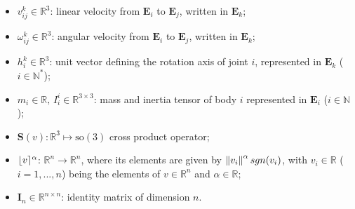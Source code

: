 \begin{itemize}
%
\item $v^{k}_{ij} \in \mathbb{R}^{3}$: linear velocity from $\mathbf{E}_i$ to  $\mathbf{E}_{j}$, written in $\mathbf{E}_k$;
%
\item $\omega^{k}_{ij} \in \mathbb{R}^{3}$: angular velocity from $\mathbf{E}_i$ to $\mathbf{E}_{j}$, written in $\mathbf{E}_k$;
%
%
%
\item $h^{k}_{i} \in \mathbb{R}^{3}$: unit vector defining the rotation axis of joint $i$, represented in $\mathbf{E}_k$ ($i \in \mathbb{N}^*$);
%

\item $m_i \in \mathbb{R} ,\, I^{i}_{i} \in \mathbb{R}^{3 \times 3}$: mass and inertia tensor of body $i$ represented in $\mathbf{E}_{i}$ ($i \in \mathbb{N}$);
%
\item $\mathbf{S}(v) : \mathbb{R}^3 \mapsto \mathrm{so}(3)$ cross product operator;
%
\item $\lfloor v \rceil^{\alpha}$: $\mathbb{R}^n \rightarrow \mathbb{R}^n$, where its elements are given by $\left\lVert v_i\right\rVert^{\alpha}sgn(v_i)$, with $v_i \in \mathbb{R}$ ($i = 1,...,n$) being the elements of $v \in \mathbb{R}^n$ and $\alpha \in \mathbb{R}$;
%
\item $\mathbf{I}_{n} \in \mathbb{R}^{n \times n}$: identity matrix of dimension $n$.
%
\end{itemize}
